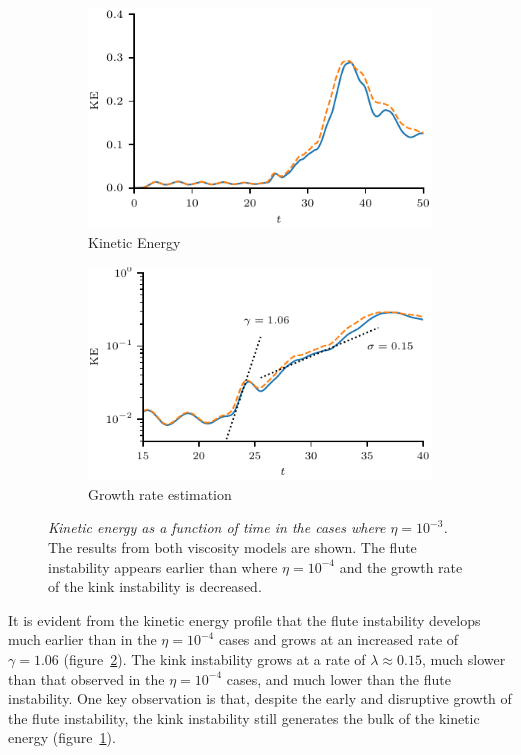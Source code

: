 \documentclass[fleqn,usenatbib]{mnras}
\newcommand{\mycaption}[2]{\caption[#1]{\emph{#1} #2}}
\begin{document}
\begin{figure}
  \centering
    \begin{subfigure}{0.49\textwidth}
      \includegraphics[width=\linewidth]{kinetic_energy-3.pdf}
      \caption{Kinetic Energy}
      \label{fig:kink_ke-3}
    \end{subfigure}
    \hfill
    \begin{subfigure}{0.49\textwidth}
      \includegraphics[width=\linewidth]{kinetic_energy_log-3.pdf}
      \caption{Growth rate estimation}
      \label{fig:kink_ke_log-3}
    \end{subfigure}
\mycaption{Kinetic energy as a function of time in the cases where
$\eta=10^{-3}$.}{The results from both viscosity models are shown. The flute
instability appears earlier than where $\eta=10^{-4}$ and the growth rate of
the kink instability is decreased.}
\label{fig:kink_str8_ke-3}%
\end{figure}

It is evident from the kinetic energy profile that the flute instability
develops much earlier than in the $\eta=10^{-4}$ cases and grows at an
increased rate of $\gamma = 1.06$ (figure~\ref{fig:kink_ke_log-3}). The kink
instability grows at a rate of $\lambda \approx 0.15$, much slower than that
observed in the $\eta=10^{-4}$ cases, and much lower than the flute
instability. One key observation is that, despite the early and disruptive
growth of the flute instability, the kink instability still generates the bulk
of the kinetic energy (figure~\ref{fig:kink_ke-3}).
\end{document}
